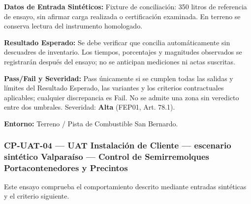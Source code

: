 \par\noindent\textbf{Datos de Entrada Sintéticos:} Fixture de conciliación: 350 litros de referencia de ensayo, sin afirmar carga realizada o certificación examinada. En terreno se conserva lectura del instrumento homologado.\par
\par\noindent\textbf{Resultado Esperado:} Se debe verificar que concilia automáticamente sin descuadres de inventario. Los tiempos, porcentajes y magnitudes observados se registrarán después del ensayo; no se anticipan mediciones ni actas suscritas.\par
\par\noindent\textbf{Pass/Fail y Severidad:} Pass únicamente si se cumplen todas las salidas y límites del Resultado Esperado, las variantes y los criterios contractuales aplicables; cualquier discrepancia es Fail. No se admite una zona sin veredicto entre dos umbrales. Severidad: \textbf{Alta} (FEP01, Art. 78.1).\par
\par\noindent\textbf{Entorno:} Terreno / Pista de Combustible San Bernardo.\par






\subsubsection*{CP-UAT-04 — UAT Instalación de Cliente — escenario sintético Valparaíso — Control de Semirremolques Portacontenedores y Precintos}\label{sec:9-cp-uat-04}
Este ensayo comprueba el comportamiento descrito mediante entradas sintéticas y el criterio siguiente.

